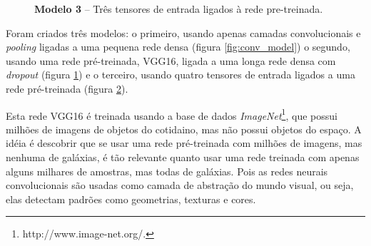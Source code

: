\pagebreak
\begin{figure}[ht!]
  \centering
  \begin{minipage}[t]{.47\textwidth}
    \centering
    
    \label{fig:conv_model}
  \end{minipage}%
  \hfill%
  \begin{minipage}[t]{.47\textwidth}
    \centering
    
    \label{fig:pretrained_model}
  \end{minipage}
\end{figure}
\pagebreak
\begin{figure}[h!]
  \centering
  
  \caption{\textbf{Modelo 3} -- Três tensores de entrada ligados à rede pre-treinada.}
  \label{fig:splus_model}
\end{figure}
\pagebreak

Foram criados três modelos: o primeiro, usando apenas camadas convolucionais e \emph{pooling} ligadas a uma pequena rede densa (figura \ref{fig:conv_model}) o segundo, usando uma rede pré-treinada, VGG16, ligada a uma longa rede densa com \emph{dropout} (figura \ref{fig:pretrained_model}) e o terceiro, usando quatro tensores de entrada ligados a uma rede pré-treinada (figura \ref{fig:splus_model}).

Esta rede VGG16 é treinada usando a base de dados \emph{ImageNet}\footnote{http://www.image-net.org/.}, que possui milhões de imagens de objetos do cotidaino, mas não possui objetos do espaço. A idéia é descobrir que se usar uma rede pré-treinada com milhões de imagens, mas nenhuma de galáxias, é tão relevante quanto usar uma rede treinada com apenas alguns milhares de amostras, mas todas de galáxias. Pois as redes neurais convolucionais são usadas como camada de abstração do mundo visual, ou seja, elas detectam padrões como geometrias, texturas e cores.


